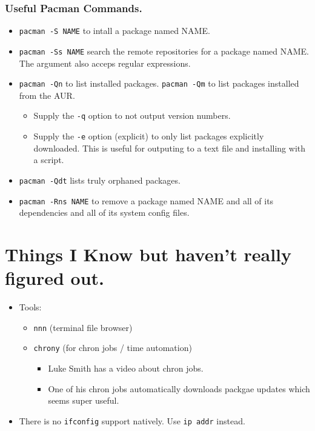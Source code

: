 \documentclass{article}
\begin{document}
    \subsubsection{Useful Pacman Commands.}
      \begin{itemize}
        \item \verb|pacman -S NAME| to intall a package named NAME.
        \item \verb|pacman -Ss NAME| search the remote repositories for a
          package named NAME. The argument also acceps regular expressions.
        \item \verb|pacman -Qn| to list installed packages. \verb|pacman -Qm|
          to list packages installed from the AUR.
          \begin{itemize}
            \item Supply the \verb|-q| option to not output version numbers.
            \item Supply the \verb|-e| option (explicit) to only list packages
              explicitly downloaded. This is useful for outputing to a text file
              and installing with a script.
          \end{itemize}
        \item \verb|pacman -Qdt| lists truly orphaned packages.
        \item \verb|pacman -Rns NAME| to remove a package named NAME and all of
          its dependencies and all of its system config files.
      \end{itemize}

\section{Things I Know but haven't really figured out.}
  \begin{itemize}
    \item Tools:
      \begin{itemize}
        \item \verb|nnn| (terminal file browser)
        \item \verb|chrony| (for chron jobs / time automation)
        \begin{itemize}
          \item Luke Smith has a video about chron jobs.
          \item One of his chron jobs automatically downloads packgae updates
            which seems super useful.
        \end{itemize}
      \end{itemize}
    \item There is no \verb|ifconfig| support natively. Use \verb|ip addr|
      instead.
  \end{itemize}
\end{document}
